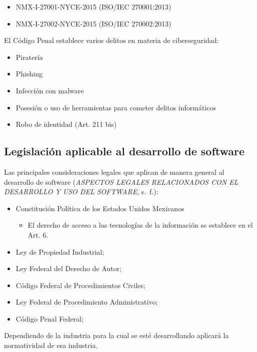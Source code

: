 \documentclass[
  12,
]{scrartcl}
\providecommand{\tightlist}{%
  \setlength{\itemsep}{0pt}\setlength{\parskip}{0pt}}
\begin{document}
\begin{itemize}
\tightlist
\item
  NMX-I-27001-NYCE-2015 (ISO/IEC 270001:2013)
\item
  NMX-I-27002-NYCE-2015 (ISO/IEC 270002:2013)
\end{itemize}

El Código Penal establece varios delitos en materia de ciberseguridad:

\begin{itemize}
\tightlist
\item
  Piratería
\item
  Phishing
\item
  Infección con malware
\item
  Posesión o uso de herramientas para cometer delitos informáticos
\item
  Robo de identidad (Art. 211 bis)
\end{itemize}

\hypertarget{legislaciuxf3n-aplicable-al-desarrollo-de-software}{%
\subsection{Legislación aplicable al desarrollo de
software}\label{legislaciuxf3n-aplicable-al-desarrollo-de-software}}

Las principales consideraciones legales que aplican de manera general al
desarrollo de software (\emph{ASPECTOS LEGALES RELACIONADOS CON EL
DESARROLLO Y USO DEL SOFTWARE}, s.~f.):

\begin{itemize}
\item
  Constitución Política de los Estados Unidos Mexicanos

  \begin{itemize}
  \tightlist
  \item
    El derecho de acceso a las tecnologías de la información se
    establece en el Art. 6.
  \end{itemize}
\item
  Ley de Propiedad Industrial;
\item
  Ley Federal del Derecho de Autor;
\item
  Código Federal de Procedimientos Civiles;
\item
  Ley Federal de Procedimiento Administrativo;
\item
  Código Penal Federal;
\end{itemize}

Dependiendo de la industria para la cual se esté desarrollando aplicará
la normatividad de esa industria.
\end{document}
